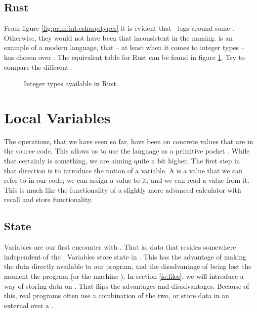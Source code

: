 \subsection{Rust}

From figure \ref{fig:prim:int:csharp:types} it is evident that \csharp\ lugs around some . Otherwise, they would not have been that inconsistent in the naming.  is an example of a modern language, that -- at least when it comes to integer types -- has chosen  over . The equivalent table for Rust can be found in figure \ref{fig:prim:int:rust:types}. Try to compare the different .

\begin{figure}[tbp]
  
  \caption{Integer types available in Rust.}
  \label{fig:prim:int:rust:types}
\end{figure}

\section{Local Variables}

The operations, that we have seen so far, have been on concrete values that are  in the source code. This allows us to use the language as a primitive pocket . While that certainly is something, we are aiming quite a bit higher. The first step in that direction is to introduce the notion of a variable. A  is a  value that we can refer to in our code; we can assign a value to it, and we can read a value from it. This is much like the  functionality of a slightly more advanced calculator with recall and store functionality.

\subsection{State}

Variables are our first encounter with . That is, data that resides somewhere independent of the . Variables store state in . This has the advantage of making the data directly available to our program, and the disadvantage of being lost the moment the program  (or the machine ). In section \ref{io:files}, we will introduce a way of storing data on . That flips the advantages and disadvantages. Because of this, real programs often use a combination of the two, or store data in an external  over a .

